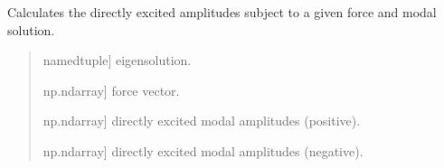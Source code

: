 \documentclass[letterpaper,10pt,english]{sphinxmanual}
\begin{document}
\begin{fulllineitems}
\label{\detokenize{core:pywfe.core.forced_problem.calculate_excited_amplitudes}}
\pysigstartsignatures
{}
\pysigstopsignatures
\sphinxAtStartPar
Calculates the directly excited amplitudes subject to a given force
and modal solution.
\begin{quote}\begin{description}
\begin{description}
\sphinxlineitem{\sphinxstylestrong{eigensolution}}{[}namedtuple{]}
\sphinxAtStartPar
eigensolution.

\sphinxlineitem{\sphinxstylestrong{force}}{[}np.ndarray{]}
\sphinxAtStartPar
force vector.

\end{description}

\begin{description}
\sphinxlineitem{\sphinxstylestrong{e\_plus}}{[}np.ndarray{]}
\sphinxAtStartPar
directly excited modal amplitudes (positive).

\sphinxlineitem{\sphinxstylestrong{e\_minus}}{[}np.ndarray{]}
\sphinxAtStartPar
directly excited modal amplitudes (negative).

\end{description}

\end{description}\end{quote}

\end{fulllineitems}

\end{document}
